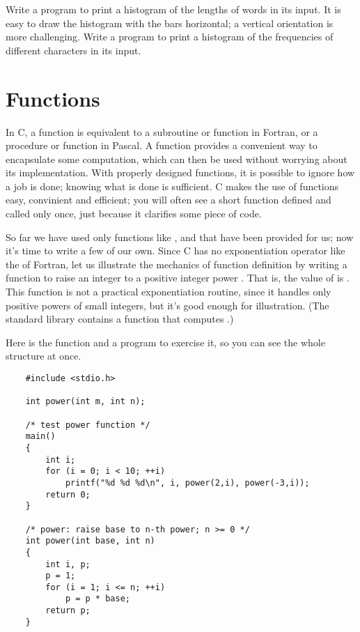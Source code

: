 \begin{ExerciseList}
\Exercise Write a program to print a histogram of the lengths of words in its input. It is easy to draw the histogram with the bars horizontal; a vertical orientation is more challenging.
\Exercise Write a program to print a histogram of the frequencies of different characters in its input.
\end{ExerciseList}



\section{Functions}


In C, a function is equivalent to a subroutine or function in Fortran, or a procedure or function in Pascal.
A function provides a convenient way to encapsulate some computation, which can then be used without worrying about its implementation.
With properly designed functions, it is possible to ignore how a job is done; knowing what is done is sufficient.
C makes the use of functions easy, convinient and efficient; you will often see a short function defined and called only once, just because it clarifies some piece of code.

So far we have used only functions like ,  and  that have been provided for us; now it's time to write a few of our own.
Since C has no exponentiation operator like the \code{**} of Fortran, let us illustrate the mechanics of function definition by writing a function  to raise an integer  to a positive integer power .
That is, the value of  is .
This function is not a practical exponentiation routine, since it handles only positive powers of small integers, but it's good enough for illustration. (The standard library contains a function  that computes .)

Here is the function  and a  program to exercise it, so you can see the whole structure at once.
\begin{lstlisting}
	#include <stdio.h>

	int power(int m, int n);

	/* test power function */
	main()
	{
		int i;
		for (i = 0; i < 10; ++i)
			printf("%d %d %d\n", i, power(2,i), power(-3,i));
		return 0;
	}

	/* power: raise base to n-th power; n >= 0 */
	int power(int base, int n)
	{
		int i, p;
		p = 1;
		for (i = 1; i <= n; ++i)
			p = p * base;
		return p;
	}
\end{lstlisting}

